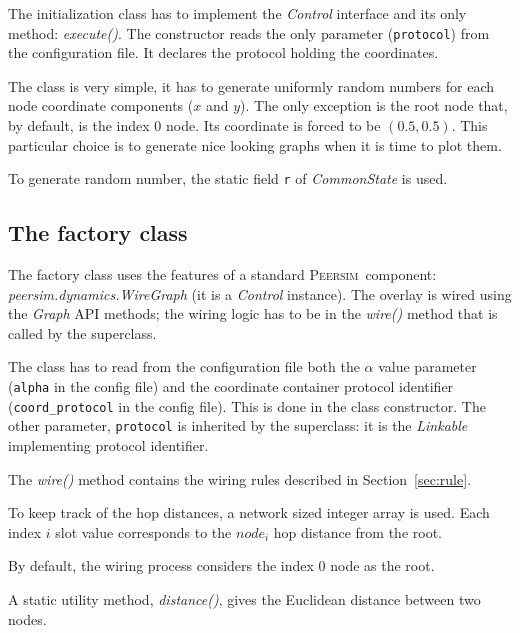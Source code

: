 \documentclass[a4paper,12pt]{article}
\newcommand{\id}[1]{{\scshape\small #1}}
\newcommand{\psim}{\id{Peersim}}
\begin{document}
The initialization class has to implement the \emph{Control} interface
and its only method: \emph{execute()}. 
The constructor reads the only parameter (\texttt{protocol}) from 
the configuration
file. It declares the protocol holding the coordinates.

The class is very simple, it
has to generate uniformly random numbers for each node coordinate
components ($x$ and $y$). The only exception is the root node that, by
default, is the index 0 node. Its coordinate is forced to be $(0.5,
0.5)$. This particular choice is to generate nice looking graphs when
it is time to plot them.

To generate random number, the static field \texttt{r} of
\emph{CommonState} is used.

\subsection{The factory class}
\label{s:factory}

The factory class uses the features of a standard \psim~component:
\emph{peersim.dynamics.WireGraph} (it is a \emph{Control}
instance). The overlay is wired using the 
\emph{Graph} API methods; the wiring logic has to be in the
\emph{wire()} method that is called by the superclass.

The class has to read from the configuration file both the $\alpha$
value parameter (\texttt{alpha} in the config file) and the coordinate
container protocol identifier (\texttt{coord\_protocol} in the config
file). This
is done in the class constructor. The other parameter, \texttt{protocol}
is inherited by the superclass: it is the \emph{Linkable}
implementing protocol identifier.

The \emph{wire()} method contains the wiring rules described in
Section~\ref{sec:rule}.

To keep track of the hop distances, a network sized integer array is
used. Each index $i$ slot value corresponds to the $node_{i}$ hop distance from the
root.

By default, the wiring process considers the index 0 node as the root.

A static utility method, \emph{distance()}, gives the Euclidean
distance between two nodes.
\end{document}
